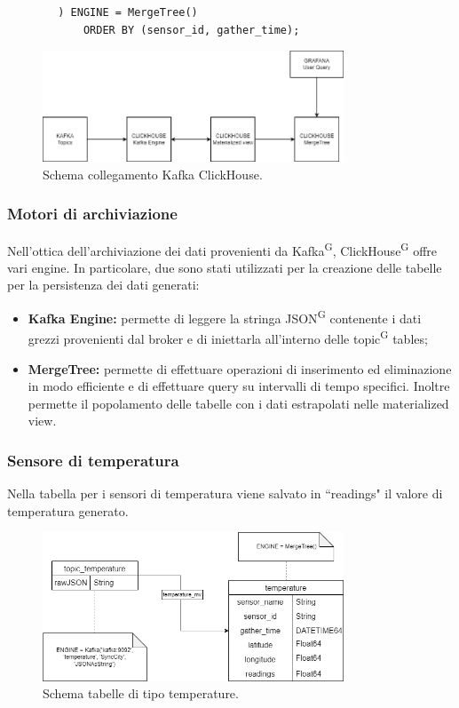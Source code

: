 \documentclass[8pt]{article}
\newcommand{\glossterm}[1]{#1\textsuperscript{G}} %
\begin{document}
\begin{itemize}
\begin{verbatim}
        ) ENGINE = MergeTree()
            ORDER BY (sensor_id, gather_time);
    \end{verbatim}
\end{itemize}
\begin{figure}[h!]
    \centering
    \includegraphics[width=0.8\textwidth]{images_st/kafka-clickhouse.png}
    \caption{Schema collegamento Kafka ClickHouse.}
    \label{fig:Schema collegamento Kafka ClickHouse}
\end{figure}
\subsubsection{Motori di archiviazione}
Nell'ottica dell'archiviazione dei dati provenienti da \glossterm{Kafka}, \glossterm{ClickHouse} offre vari engine. In particolare, due sono stati utilizzati per la creazione delle tabelle per la persistenza dei dati generati:
\begin{itemize}
	\setlength\itemsep{0em}
    \item \textbf{Kafka Engine:} permette di leggere la stringa \glossterm{JSON} contenente i dati grezzi provenienti dal broker e di iniettarla all’interno delle \glossterm{topic} tables;
    \item \textbf{MergeTree:} permette di effettuare operazioni di inserimento ed eliminazione in modo efficiente e di effettuare query su intervalli di tempo specifici. Inoltre permette il popolamento delle tabelle con i dati estrapolati nelle materialized view. 
\end{itemize}
\subsubsection{Sensore di temperatura}
Nella tabella per i sensori di temperatura viene salvato in ``readings" il valore di temperatura generato.
\begin{figure}[h!]
    \centering
    \includegraphics[width=0.8\textwidth]{images_st/tabelle_temperature.png}
    \caption{Schema tabelle di tipo temperature.}
    \label{fig:Schema tabelle di tipo temperature}
\end{figure}
\clearpage
\end{document}
